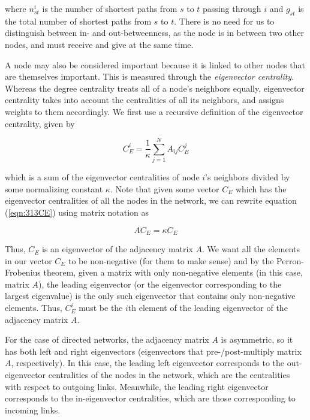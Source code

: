 \documentclass[12pt,letterpaper]{report}
\begin{document}
	where $n^{i}_{st}$ is the number of shortest paths from $s$ to $t$ passing through $i$ and $g_{st}$ is the total number of shortest paths from $s$ to $t$. There is no need for us to distinguish between in- and out-betweenness, as the node is in between two other nodes, and must receive and give at the same time.
	
	A node may also be considered important because it is linked to other nodes that are themselves important. This is measured through the \textit{eigenvector centrality}. Whereas the degree centrality treats all of a node’s neighbors equally, eigenvector centrality takes into account the centralities of all its neighbors, and assigns weights to them accordingly. We first use a recursive definition of the eigenvector centrality, given by

	\begin{equation}
	\label{eqn:313CE} C_{E}^{i} = \frac{1}{\kappa} \sum_{j = 1}^{N} A_{ij}C_{E}^{j}
	\end{equation}
	
	which is a sum of the eigenvector centralities of node $i$’s neighbors divided by some normalizing constant $\kappa$. Note that given some vector $C_{E}$ which has the eigenvector centralities of all the nodes in the network, we can rewrite equation (\ref{eqn:313CE}) using matrix notation as
	
	\begin{equation}
	\label{eqn:314CEmatrix} AC_{E} = \kappa C_{E} \end{equation}
	
	Thus, $C_{E}$ is an eigenvector of the adjacency matrix $A$. We want all the elements in our vector $C_{E}$ to be non-negative (for them to make sense) and by the Perron-Frobenius theorem, given a matrix with only non-negative elements (in this case, matrix $A$), the leading eigenvector (or the eigenvector corresponding to the largest eigenvalue) is the only such eigenvector that contains only non-negative elements. Thus, $C_{E}^{i}$ must be the $i$th element of the leading eigenvector of the adjacency matrix $A$.
	
	For the case of directed networks, the adjacency matrix $A$ is asymmetric, so it has both left and right eigenvectors (eigenvectors that pre-/post-multiply matrix $A$, respectively). In this case, the leading left eigenvector corresponds to the out-eigenvector centralities of the nodes in the network, which are the centralities with respect to outgoing links. Meanwhile, the leading right eigenvector corresponds to the in-eigenvector centralities, which are those corresponding to incoming links. 
	
\end{document}
